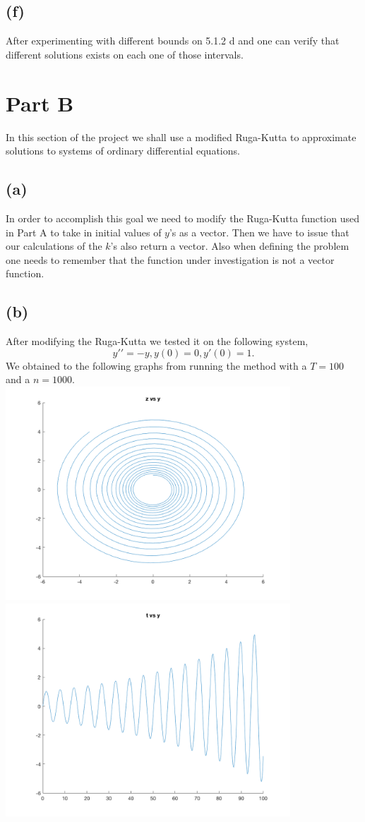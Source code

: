\documentclass{article}
\begin{document}
\subsection*{(f)}
After experimenting with different bounds on 5.1.2 d and one can verify that different solutions exists on each one of those intervals. 

\section*{Part B}
In this section of the project we shall use a modified Ruga-Kutta to approximate solutions to systems of ordinary differential equations. 
\subsection*{(a)}
In order to accomplish this goal we need to modify the Ruga-Kutta function used in Part A to take in initial values of $y$'s as a vector. Then we have to issue that our calculations of the $k$'s also return a vector. Also when defining the problem one needs to remember that the function under investigation is not a vector function. 

\subsection*{(b)}
After modifying the Ruga-Kutta we tested it on the following system, 
$$ y′′ = −y, y(0)=0, y′(0)=1. $$
We obtained to the following graphs from running the method with a $T= 100$ and a $n=1000$. \\
\includegraphics[height=8cm]{partB_1}\\
\includegraphics[height=8cm]{partB_2}\\
\end{document}
